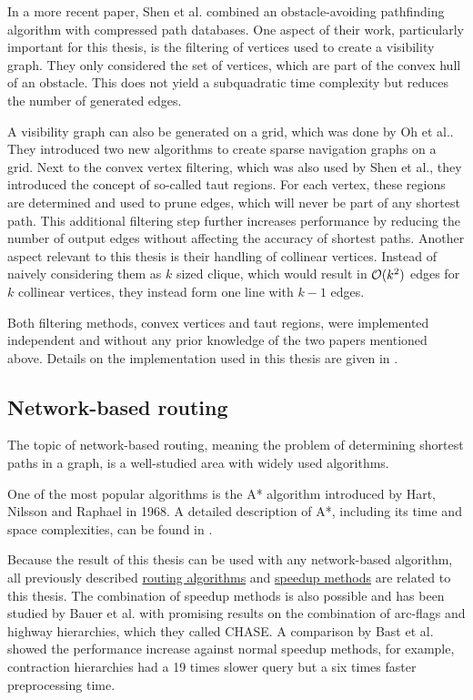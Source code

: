 		In a more recent paper, Shen et al. combined an obstacle-avoiding pathfinding algorithm with compressed path databases\cite{shen-euclidean-routing-cpd}.
		One aspect of their work, particularly important for this thesis, is the filtering of vertices used to create a visibility graph.
		They only considered the set of vertices, which are part of the convex hull of an obstacle.
		This does not yield a subquadratic time complexity but reduces the number of generated edges.
		
		A visibility graph can also be generated on a grid, which was done by Oh et al.\cite{oh-grid-vgraph}.
		They introduced two new algorithms to create sparse navigation graphs on a grid.
		Next to the convex vertex filtering, which was also used by Shen et al., they introduced the concept of so-called taut regions.
		For each vertex, these regions are determined and used to prune edges, which will never be part of any shortest path.
		This additional filtering step further increases performance by reducing the number of output edges without affecting the accuracy of shortest paths.
		Another aspect relevant to this thesis is their handling of collinear vertices.
		Instead of naively considering them as $k$ sized clique, which would result in $\mathcal{O}(k^2)$ edges for $k$ collinear vertices, they instead form one line with $k-1$ edges.
		
		Both filtering methods, convex vertices and taut regions, were implemented independent and without any prior knowledge of the two papers mentioned above.
		Details on the implementation used in this thesis are given in .
		
	\subsection{Network-based routing}
	
		The topic of network-based routing, meaning the problem of determining shortest paths in a graph, is a well-studied area with widely used algorithms.
		
		One of the most popular algorithms is the A* algorithm introduced by Hart, Nilsson and Raphael in 1968\cite{astar}.
		A detailed description of A*, including its time and space complexities, can be found in .

		Because the result of this thesis can be used with any network-based algorithm, all previously described \hyperref[subsec:routing-engines]{routing algorithms} and \hyperref[subsec:speedup-methods]{speedup methods} are related to this thesis.
		The combination of speedup methods is also possible and has been studied by Bauer et al.\cite{bauer-combining-speedup-methods} with promising results on the combination of arc-flags and highway hierarchies, which they called CHASE.
		A comparison by Bast et al. showed the performance increase against normal speedup methods\cite{bast-transportation-networks}, for example, contraction hierarchies had a 19 times slower query but a six times faster preprocessing time.

